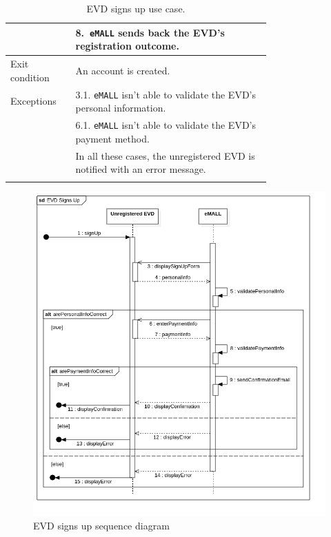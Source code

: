 \begin{center}
\begin{longtable}{lp{0.75\linewidth}}
        & 8.\ \verb|eMALL| sends back the EVD’s registration outcome.                                                                                                                                            \\
        \hline
        Exit condition   & An account is created.                                                                                                                                                                                 \\
        \hline
        Exceptions       & 3.1. \verb|eMALL| isn’t able to validate the EVD’s personal information.                                                                                                                               \\
        & 6.1. \verb|eMALL| isn’t able to validate the EVD’s payment method.                                                                                                                                     \\
        & In all these cases, the unregistered EVD is notified with an error message.                                                                                                                            \\
        \hline
        \caption{EVD signs up use case.}
        \label{tab: EVD_sign_up_use_case}
    \end{longtable}

    \begin{figure} [H]
        \begin{center}
            \includegraphics[width=0.9\linewidth]{Images/SequenceDiagrams/evd_signs_up}
            \caption{EVD signs up sequence diagram}
            \label{fig: evd_sign_up_seq_diag}
        \end{center}
    \end{figure}
\end{center}

